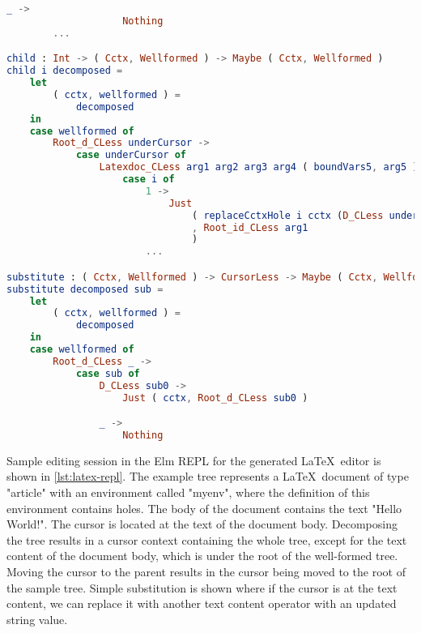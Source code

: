 \begin{lstlisting}[style=inline, language=elm, caption={Generated functions for cursor movement for the \LaTeX language}, label={lst:latex-movement}]
                _ ->
                    Nothing
        ...

child : Int -> ( Cctx, Wellformed ) -> Maybe ( Cctx, Wellformed )
child i decomposed =
    let
        ( cctx, wellformed ) =
            decomposed
    in
    case wellformed of
        Root_d_CLess underCursor ->
            case underCursor of
                Latexdoc_CLess arg1 arg2 arg3 arg4 ( boundVars5, arg5 ) ->
                    case i of
                        1 ->
                            Just
                                ( replaceCctxHole i cctx (D_CLess underCursor)
                                , Root_id_CLess arg1
                                )
                        ...

substitute : ( Cctx, Wellformed ) -> CursorLess -> Maybe ( Cctx, Wellformed )
substitute decomposed sub =
    let
        ( cctx, wellformed ) =
            decomposed
    in
    case wellformed of
        Root_d_CLess _ ->
            case sub of
                D_CLess sub0 ->
                    Just ( cctx, Root_d_CLess sub0 )

                _ ->
                    Nothing
\end{lstlisting}

Sample editing session in the Elm REPL for the generated \LaTeX \ editor is
shown in \cref{lst:latex-repl}. The example tree represents a \LaTeX \ document of type "article" with an environment called "myenv", where the
definition of this environment contains holes. The body of the document
contains the text "Hello World!". The cursor is located at the text of the
document body. Decomposing the tree results in a cursor context containing
the whole tree, except for the text content of the document body, which
is under the root of the well-formed tree. Moving the cursor to the parent
results in the cursor being moved to the root of the sample tree. Simple
substitution is shown where if the cursor is at the text content, we can
replace it with another text content operator with an updated string value.

